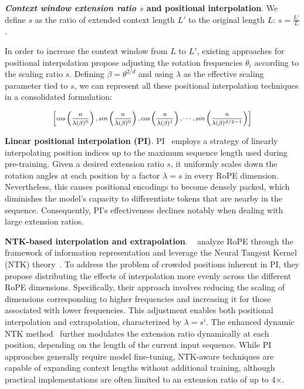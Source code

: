 \textbf{\emph{Context window extension ratio $s$} and positional interpolation}. We define $s$ as  the ratio of extended context length $L'$ to the original length $L$: $s=\frac{L'}{L}$. 

In order to increase the context window from $L$ to $L'$, existing approaches for positional interpolation propose adjusting the rotation frequencies $\theta_i$ according to the scaling ratio $s$. Defining $\beta = \theta^{2/d}$ and using $\lambda$ as the effective scaling parameter tied to $s$, we can represent all these positional interpolation techniques in a consolidated formulation:

\begin{equation}	
	\fontsize{7.5}{7.5} \selectfont
	\label{eq:unified_rope}
	\begin{aligned}
		\left[cos\left(\frac{n}{\lambda(\beta)^0}\right), sin \left(\frac{n}{\lambda(\beta)^0}\right), cos\left(\frac{n}{\lambda(\beta)^1}\right), \cdots, sin \left(\frac{n}{\lambda(\beta)^{d/2-1}}\right) \right]   
	\end{aligned}
\end{equation}

\textbf{Linear positional interpolation (PI)}. PI~\cite{pi} employs a strategy of linearly interpolating position indices up to the maximum sequence length used during pre-training. Given a desired extension ratio $s$, it uniformly scales down the rotation angles at each position by a factor $\lambda = s$ in every RoPE dimension. Nevertheless, this causes positional encodings to become densely packed, which diminishes the model's capacity to differentiate tokens that are nearby in the sequence. Consequently, PI's effectiveness declines notably when dealing with large extension ratios.

\textbf{NTK-based interpolation and extrapolation}. ~\cite{ntk,dynamicntk} analyze RoPE through the framework of information representation and leverage the Neural Tangent Kernel (NTK) theory~\cite{jacot2018neural,tancik2020fourier}. To address the problem of crowded positions inherent in PI, they propose distributing the effects of interpolation more evenly across the different RoPE dimensions. Specifically, their approach involves reducing the scaling of dimensions corresponding to higher frequencies and increasing it for those associated with lower frequencies. This adjustment enables both positional interpolation and extrapolation, characterized by $\lambda=s^{i}$. The enhanced dynamic NTK method~\cite{dynamicntk} further modulates the extension ratio dynamically at each position, depending on the length of the current input sequence. While PI approaches generally require model fine-tuning, NTK-aware techniques are capable of expanding context lengths without additional training, although practical implementations are often limited to an extension ratio of up to 4$\times$.

